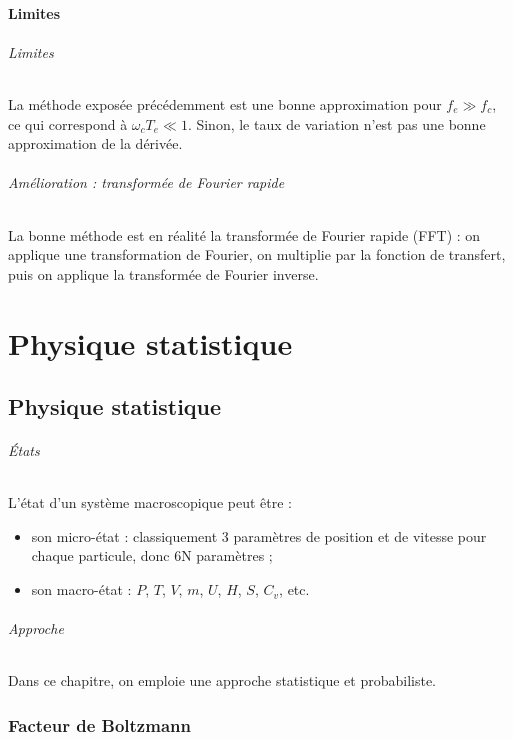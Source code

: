 \documentclass[french]{book}
\theoremstyle{plain}
\theoremstyle{definition}
\theoremstyle{remark}
\begin{document}
\subsection{Limites}

\paragraph{Limites} La méthode exposée précédemment est une bonne approximation pour $f_e\gg f_c$, ce qui correspond à $\omega_c T_e\ll 1$. Sinon, le taux de variation n'est pas une bonne approximation de la dérivée.

\paragraph{Amélioration : transformée de Fourier rapide} La bonne méthode est en réalité la transformée de Fourier rapide (FFT) : on applique une transformation de Fourier, on multiplie par la fonction de transfert, puis on applique la transformée de Fourier inverse.


\part{Physique statistique}
\chapter{Physique statistique}
\localtableofcontents
\paragraph{États} L'état d'un système macroscopique peut être :
\begin{itemize}
	\item son micro-état : classiquement 3 paramètres de position et de vitesse pour chaque particule, donc 6N paramètres ;
	\item son macro-état : $P$, $T$, $V$, $m$, $U$, $H$, $S$, $C_v$, etc.
\end{itemize}
\paragraph{Approche} Dans ce chapitre, on emploie une approche statistique et probabiliste.
\section{Facteur de Boltzmann}
\end{document}
